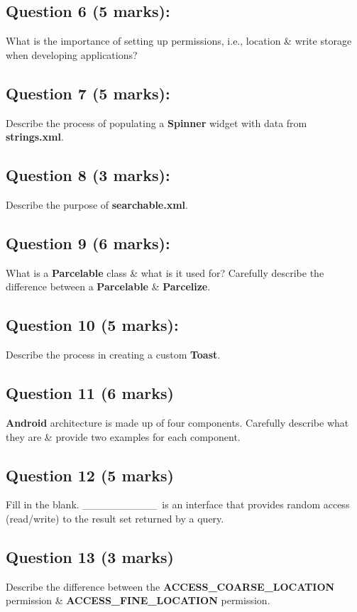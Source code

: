 \documentclass{article}
\begin{document}
\subsection*{Question 6 (5 marks):}
What is the importance of setting up permissions, i.e., location \& write storage when developing applications?

\subsection*{Question 7 (5 marks):}
Describe the process of populating a \textbf{Spinner} widget with data from \textbf{strings.xml}.

\subsection*{Question 8 (3 marks):}
Describe the purpose of \textbf{searchable.xml}.

\subsection*{Question 9 (6 marks):}
What is a \textbf{Parcelable} class \& what is it used for? Carefully describe the difference between a \textbf{Parcelable} \& \textbf{Parcelize}.

\subsection*{Question 10 (5 marks):}
Describe the process in creating a custom \textbf{Toast}.

\subsection*{Question 11 (6 marks)}
\textbf{Android} architecture is made up of four components. Carefully describe what they are \& provide two examples for each component.

\subsection*{Question 12 (5 marks)}
Fill in the blank. \_\_\_\_\_\_\_\_\_\_\ is an interface that provides random access (read/write) to the result set returned by a query.

\subsection*{Question 13 (3 marks)}
Describe the difference between the \textbf{ACCESS\_COARSE\_LOCATION} permission \& \textbf{ACCESS\_FINE\_LOCATION} permission.
\end{document}
